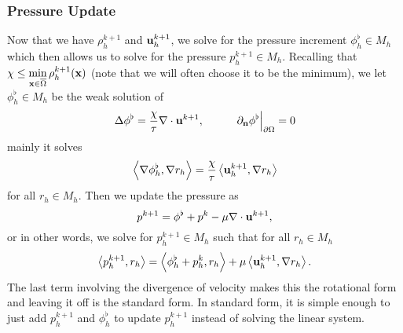 \documentclass[letterpaper]{erdc}
\begin{document}
\subsubsection{Pressure Update}
Now that we have $\rho_h^{k+1}$ and $\textbf{u}_h^{k+1}$, we solve for the pressure increment $\phi_h^{\flat}\in M_h$ which then allows us to solve for the pressure $p_h^{k+1}\in M_h$.  
Recalling that $\chi \leq \displaystyle\min_{\textbf{x}\in\overline{\Omega}} \rho_h^{k+1}(\textbf{x})$ (note that we will often choose it to be the minimum), we let $\phi_h^{\flat}\in M_h$ be the weak solution of
\begin{equation}
  \Delta \phi^{\flat} = \frac{\chi}{\tau}\nabla\cdot \textbf{u}^{k+1}, \hspace{1cm} \left.\partial_{\textbf{n}}\phi^{\flat}\right|_{\partial\Omega} = 0
\end{equation}
mainly it solves
\begin{equation}
  \left\langle \nabla\phi_h^{\flat}, \nabla r_h \right\rangle = \frac{\chi}{\tau}\left\langle \textbf{u}_h^{k+1}, \nabla r_h \right\rangle
\end{equation}
for all $r_h \in M_h$.  Then we update the pressure as
\begin{equation}
  p^{k+1} = \phi^{\flat} + p^{k} - \mu\nabla\cdot \textbf{u}^{k+1},
\end{equation}
or in other words, we solve for $p_h^{k+1}\in M_h$ such that for all $r_h\in M_h$
\begin{equation}
  \left\langle p_h^{k+1}, r_h \right\rangle = \left\langle \phi_h^{\flat} + p_h^{k}, r_h \right\rangle + \mu\left\langle \textbf{u}_h^{k+1}, \nabla r_h \right\rangle.
\end{equation}
The last term involving the divergence of velocity makes this the rotational form and leaving it off is the standard form.  In standard form, it is simple enough to just add $p_h^{k+1}$ and $\phi_h^{\flat}$ to update $p_h^{k+1}$ instead of solving the linear system.
\end{document}
